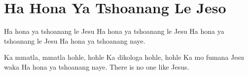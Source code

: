 \starttocol
\chapter{Ha Hona Ya Tshoanang Le Jeso}
\nexttocol
\hfill{\it }
\stoptocol
\starttocol
\startlines
H{\sc a} hona ya tshoanang le Jesu
Ha hona ya tshoanang le Jesu
Ha hona ya tshoanang le Jesu
Ha hona ya tshoanang naye.

Ka mmatla, mmatla hohle, hohle
Ka dikologa hohle, hohle
Ka mo fumana Jesu waka
Ha hona ya tshoanang naye.
\stoplines
\nexttocol
There is no one like Jesus.
\stoptocol
